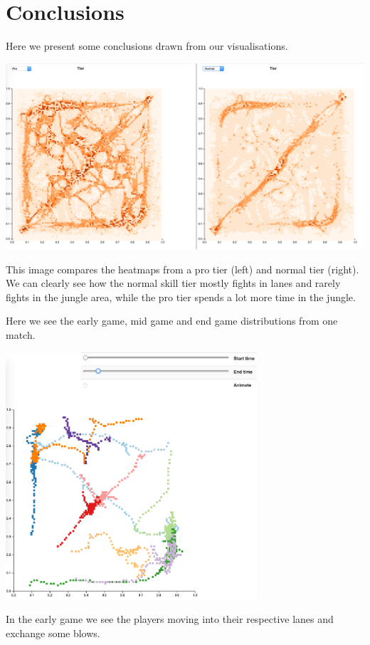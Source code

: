 \section{Conclusions}

Here we present some conclusions drawn from our visualisations.

\includegraphics[width=\textwidth]{HM_tiers}

This image compares the heatmaps from a pro tier (left) and normal tier (right). We can clearly see how the normal skill tier mostly fights in lanes and rarely fights in the jungle area, while the pro tier spends a lot more time in the jungle.

Here we see the early game, mid game and end game distributions from one match.

\includegraphics[width=0.7\textwidth]{earlygame}

In the early game we see the players moving into their respective lanes and exchange some blows.

